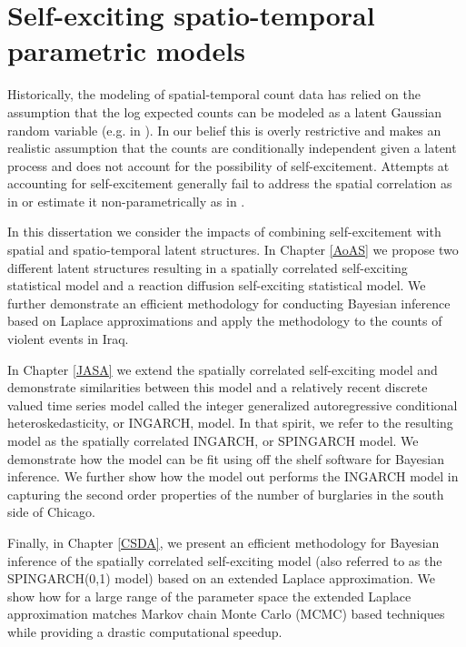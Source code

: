 \documentclass[11pt]{isuthesis}
\begin{document}
\section{Self-exciting spatio-temporal parametric models}

Historically, the modeling of spatial-temporal count data has relied on the assumption that the log expected counts can be modeled as a latent Gaussian random variable (e.g. in \cite{python2016bayesian}).  In our belief this is overly restrictive and makes an realistic assumption that the counts are conditionally independent given a latent process and does not account for the possibility of self-excitement.  Attempts at accounting for self-excitement generally fail to address the spatial correlation as in \cite{mohler2013modeling} or estimate it non-parametrically as in \cite{mohler2011self}.  

In this dissertation we consider the impacts of combining self-excitement with spatial and spatio-temporal latent structures.  In Chapter \ref{AoAS} we propose two different latent structures resulting in a spatially correlated self-exciting statistical model and a reaction diffusion self-exciting statistical model.  We further demonstrate an efficient methodology for conducting Bayesian inference based on Laplace approximations and apply the methodology to the counts of violent events in Iraq.

In Chapter \ref{JASA} we extend the spatially correlated self-exciting model and demonstrate similarities between this model and a relatively recent discrete valued time series model called the integer generalized autoregressive conditional heteroskedasticity, or INGARCH, model.  In that spirit, we refer to the resulting model as the spatially correlated INGARCH, or SPINGARCH model.  We demonstrate how the model can be fit using off the shelf software for Bayesian inference.  We further show how the model out performs the INGARCH model in capturing the second order properties of the number of burglaries in the south side of Chicago.

Finally, in Chapter \ref{CSDA}, we present an efficient methodology for Bayesian inference of the spatially correlated self-exciting model (also referred to as the SPINGARCH(0,1) model) based on an extended Laplace approximation.  We show how for a large range of the parameter space the extended Laplace approximation matches Markov chain Monte Carlo (MCMC) based techniques while providing a drastic computational speedup.
\end{document}
